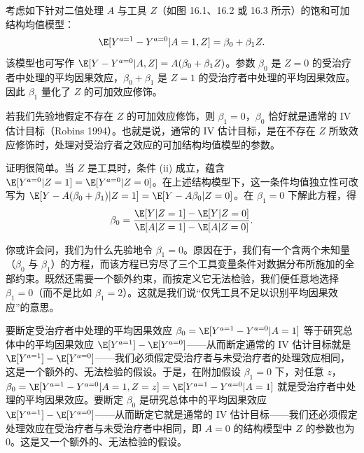 \begin{techpoint}[可加结构均值模型与 IV 估计]
考虑如下针对二值处理 $A$ 与工具 $Z$（如图 16.1、16.2 或 16.3 所示）的饱和可加结构均值模型：
\[
\E[Y^{a=1}-Y^{a=0}|A=1,Z]=\beta_0+\beta_1 Z.
\]
该模型也可写作 $\E[Y-Y^{a=0}|A,Z]=A(\beta_0+\beta_1 Z)$。参数 $\beta_0$ 是 $Z=0$ 的受治疗者中处理的平均因果效应，$\beta_0+\beta_1$ 是 $Z=1$ 的受治疗者中处理的平均因果效应。因此 $\beta_1$ 量化了 $Z$ 的可加效应修饰。

若我们先验地假定不存在 $Z$ 的可加效应修饰，则 $\beta_1=0$，$\beta_0$ 恰好就是通常的 IV 估计目标（Robins 1994）。也就是说，通常的 IV 估计目标，是在不存在 $Z$ 所致效应修饰时，处理对受治疗者之效应的可加结构均值模型的参数。

证明很简单。当 $Z$ 是工具时，条件 (ii) 成立，蕴含 $\E[Y^{a=0}|Z=1]=\E[Y^{a=0}|Z=0]$。在上述结构模型下，这一条件均值独立性可改写为 $\E[Y-A(\beta_0+\beta_1)|Z=1]=\E[Y-A\beta_0|Z=0]$。在 $\beta_1=0$ 下解此方程，得
\[
\beta_0=\frac{\E[Y|Z=1]-\E[Y|Z=0]}{\E[A|Z=1]-\E[A|Z=0]}.
\]

你或许会问，我们为什么先验地令 $\beta_1=0$。原因在于，我们有一个含两个未知量（$\beta_0$ 与 $\beta_1$）的方程，而该方程已穷尽了三个工具变量条件对数据分布所施加的全部约束。既然还需要一个额外约束，而按定义它无法检验，我们便任意地选择 $\beta_1=0$（而不是比如 $\beta_1=2$）。这就是我们说“仅凭工具不足以识别平均因果效应”的意思。

要断定受治疗者中处理的平均因果效应 $\beta_0=\E[Y^{a=1}-Y^{a=0}|A=1]$ 等于研究总体中的平均因果效应 $\E[Y^{a=1}]-\E[Y^{a=0}]$——从而断定通常的 IV 估计目标就是 $\E[Y^{a=1}]-\E[Y^{a=0}]$——我们必须假定受治疗者与未受治疗者的处理效应相同，这是一个额外的、无法检验的假设。于是，在附加假设 $\beta_1=0$ 下，对任意 $z$，$\beta_0=\E[Y^{a=1}-Y^{a=0}|A=1,Z=z]=\E[Y^{a=1}-Y^{a=0}|A=1]$ 就是受治疗者中处理的平均因果效应。要断定 $\beta_0$ 是研究总体中的平均因果效应 $\E[Y^{a=1}]-\E[Y^{a=0}]$——从而断定它就是通常的 IV 估计目标——我们还必须假定处理效应在受治疗者与未受治疗者中相同，即 $A=0$ 的结构模型中 $Z$ 的参数也为 0。这是又一个额外的、无法检验的假设。
\end{techpoint}

